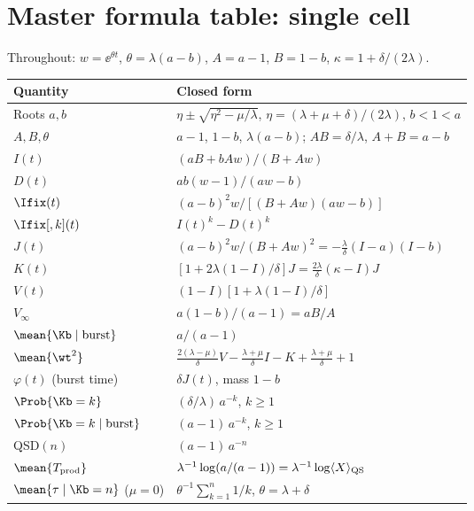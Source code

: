 
\section{Master formula table: single cell}
\label{app:formula-tables}

Throughout: $w=\ee^{\theta t}$, $\theta=\lambda(a-b)$, $A=a-1$, $B=1-b$,
$\kappa=1+\delta/(2\lambda)$.

\begin{center}
\renewcommand{\arraystretch}{1.3}
\small
\begin{tabular}{@{}p{}p{}@{}}
\toprule
Quantity & Closed form \\
\midrule
Roots $a,b$ & $\eta\pm\sqrt{\eta^2-\mu/\lambda}$, $\eta=(\lambda+\mu+\delta)/(2\lambda)$, $b<1<a$ \\
$A,B,\theta$ & $a-1$, $1-b$, $\lambda(a-b)$; $AB=\delta/\lambda$, $A+B=a-b$ \\
$I(t)$ & $(aB+bAw)/(B+Aw)$ \\
$D(t)$ & $ab(w-1)/(aw-b)$ \\
$\Ifix(t)$ & $(a-b)^2 w/[(B+Aw)(aw-b)]$ \\
$\Ifix[,{k}](t)$ & $I(t)^k-D(t)^k$ \\
$J(t)$ & $(a-b)^2 w/(B+Aw)^2=-\frac{\lambda}{\delta}(I-a)(I-b)$ \\
$K(t)$ & $[1+2\lambda(1-I)/\delta]J=\frac{2\lambda}{\delta}(\kappa-I)J$ \\
$V(t)$ & $(1-I)[1+\lambda(1-I)/\delta]$ \\
$V_\infty$ & $a(1-b)/(a-1)=aB/A$ \\
$\mean{\Kb\mid\text{burst}}$ & $a/(a-1)$ \\
$\mean{\wt^2}$ & $\frac{2(\lambda-\mu)}{\delta}V-\frac{\lambda+\mu}{\delta}I-K+\frac{\lambda+\mu}{\delta}+1$ \\
$\varphi(t)$ (burst time) & $\delta J(t)$, mass $1-b$ \\
$\Prob{\Kb=k}$ & $(\delta/\lambda)\,a^{-k}$, $k\ge1$ \\
$\Prob{\Kb=k\mid\text{burst}}$ & $(a-1)\,a^{-k}$, $k\ge1$ \\
QSD$(n)$ & $(a-1)\,a^{-n}$ \\
$\mean{T_{\rm prod}}$ & $\lambda^{-1}\log(a/(a-1))=\lambda^{-1}\log\langle X\rangle_{\rm QS}$ \\
$\mean{\tau\mid\Kb=n}$ ($\mu=0$) & $\theta^{-1}\sum_{k=1}^n 1/k$, $\theta=\lambda+\delta$ \\

\end{tabular}
\end{center}
